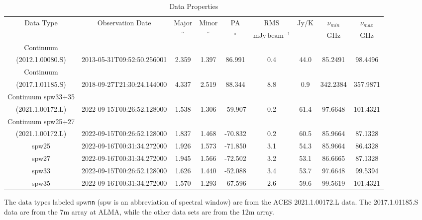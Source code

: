 \begin{table*}[htp]
\centering
\caption{Data Properties}
\begin{tabular}{ccccccccc}
\label{tab:data_props}
Data Type & Observation Date & Major & Minor & PA & RMS & Jy/K & $\nu_{min}$ & $\nu_{max}$ \\
 &  & $\mathrm{{}^{\prime\prime}}$ & $\mathrm{{}^{\prime\prime}}$ & $\mathrm{{}^{\circ}}$ & $\mathrm{mJy\,beam^{-1}}$ &  & $\mathrm{GHz}$ & $\mathrm{GHz}$ \\
\hline
Continuum&&&&&&&&\\
(2012.1.00080.S) & 2013-05-31T09:52:50.256001 & 2.359 & 1.397 & 86.991 & 0.4 & 44.0 & 85.2491 & 98.4496 \\
Continuum&&&&&&&&\\
(2017.1.01185.S) & 2018-09-27T21:30:24.144000 & 4.337 & 2.519 & 88.344 & 8.8 & 0.9 & 342.2384 & 357.9871 \\
Continuum spw33+35&&&&&&&&\\
(2021.1.00172.L) & 2022-09-15T00:26:52.128000 & 1.538 & 1.306 & -59.907 & 0.2 & 61.4 & 97.6648 & 101.4321 \\
Continuum spw25+27&&&&&&&&\\
(2021.1.00172.L) & 2022-09-15T00:26:52.128000 & 1.837 & 1.468 & -70.832 & 0.2 & 60.5 & 85.9664 & 87.1328 \\
spw25 & 2022-09-16T00:31:34.272000 & 1.926 & 1.573 & -71.850 & 3.1 & 54.3 & 85.9664 & 86.4328 \\
spw27 & 2022-09-16T00:31:34.272000 & 1.945 & 1.566 & -72.502 & 3.2 & 53.1 & 86.6665 & 87.1328 \\
spw33 & 2022-09-15T00:26:52.128000 & 1.626 & 1.440 & -52.088 & 3.4 & 53.7 & 97.6648 & 99.5394 \\
spw35 & 2022-09-16T00:31:34.272000 & 1.570 & 1.293 & -67.596 & 2.6 & 59.6 & 99.5619 & 101.4321 \\
\hline
\end{tabular}
\par

The data types labeled spw\texttt{nn} (spw is an abbreviation of spectral window) are from the ACES 2021.1.00172.L data.
The 2017.1.01185.S data are from the 7m array at ALMA, while the other data sets
are from the 12m array.

\end{table*}
